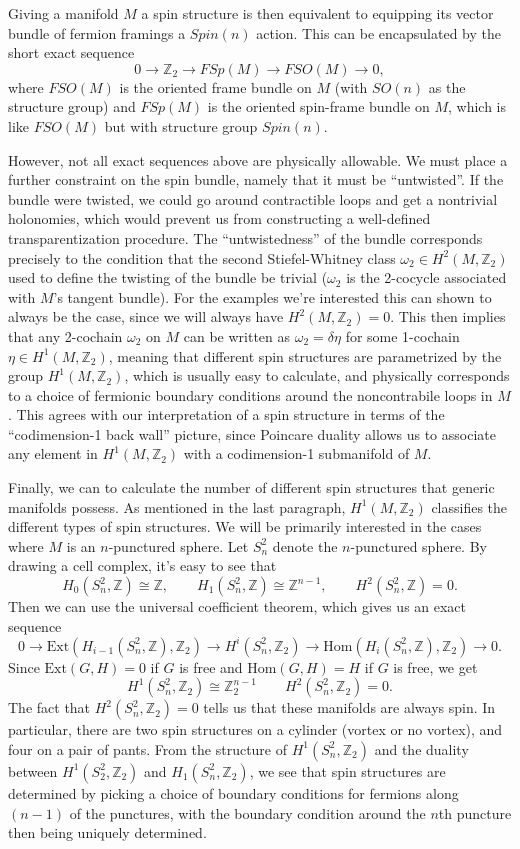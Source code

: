 \documentclass[12pt,a4paper]{article}
\newcommand{\ra}{\rightarrow}
\newcommand{\zz}{\mathbb{Z}}
\newcommand{\zt}{\mathbb{Z}_2}
\newcommand\be            {\begin{equation}}
\newcommand\ee            {\end{equation}}
\newcommand{\Hom}{\text{Hom}}
\newcommand{\Ext}{\text{Ext}}
\begin{document}
Giving a manifold $M$ a spin structure is then equivalent to equipping its vector bundle of fermion framings a $Spin(n)$ action. This can be encapsulated by the short exact sequence 
\be 0 \ra \zt \ra FSp(M) \ra FSO(M) \ra 0,\ee
where $FSO(M)$ is the oriented frame bundle on $M$ (with $SO(n)$ as the structure group) and $FSp(M)$ is the oriented spin-frame bundle on $M$, which is like $FSO(M)$ but with structure group $Spin(n)$. 

However, not all exact sequences above are physically allowable. We must place a further constraint on the spin bundle, namely that it must be ``untwisted''. If the bundle were twisted, we could go around contractible loops and get a nontrivial holonomies, which would prevent us from constructing a well-defined transparentization procedure. The ``untwistedness'' of the bundle corresponds precisely to the condition that the second Stiefel-Whitney class $\omega_2 \in H^2(M,\zt)$ used to define the twisting of the bundle be trivial ($\omega_2$ is the 2-cocycle associated with $M$'s tangent bundle). For the examples we're interested this can shown to always be the case, since we will always have $H^2(M,\zt) = 0$. This then implies that any 2-cochain $\omega_2$ on $M$ can be written as $\omega_2 = \delta \eta$ for some 1-cochain $\eta \in H^1(M,\zt)$, meaning that different spin structures are parametrized by the group $H^1(M,\zt)$, which is usually easy to calculate, and physically corresponds to a choice of fermionic boundary conditions around the noncontrabile loops in $M$. This agrees with our interpretation of a spin structure in terms of the ``codimension-1 back wall'' picture, since Poincare duality allows us to associate any element in $H^1(M,\zt)$ with a codimension-1 submanifold of $M$.

Finally, we can to calculate the number of different spin structures that generic manifolds possess. As mentioned in the last paragraph, $H^1(M,\zt)$ classifies the different types of spin structures. 
We will be primarily interested in the cases where $M$ is an $n$-punctured sphere. Let $S^2_n$ denote the $n$-punctured sphere. By drawing a cell complex, it's easy to see that 
\be H_0(S^2_n,\zz) \cong \zz,\qquad H_1(S^2_n,\zz) \cong \zz^{n-1},\qquad H^2(S^2_n,\zz) = 0.\ee
Then we can use the universal coefficient theorem, which gives us an exact sequence 
\be 0 \ra \Ext(H_{i-1}(S^2_n,\zz),\zt) \ra H^i(S^2_n,\zt) \ra \Hom(H_i(S^2_n,\zz),\zt) \ra 0.\ee
Since $\Ext(G,H) = 0$ if $G$ is free and $\Hom(G,H) = H$ if $G$ is free, we get 
\be H^1(S^2_n,\zt) \cong \zt^{n-1}\qquad H^2(S^2_n,\zt) = 0.\ee
The fact that $H^2(S^2_n,\zt) = 0$ tells us that these manifolds are always spin. 
In particular, there are two spin structures on a cylinder (vortex or no vortex), and four on a pair of pants. From the structure of $H^1(S^2_n,\zt)$ and the duality between $H^1(S^2_2,\zt)$ and $H_1(S^2_n,\zt)$, we see that spin structures are determined by picking a choice of boundary conditions for fermions along $(n-1)$ of the punctures, with the boundary condition around the $n$th puncture then being uniquely determined. 
\end{document}
